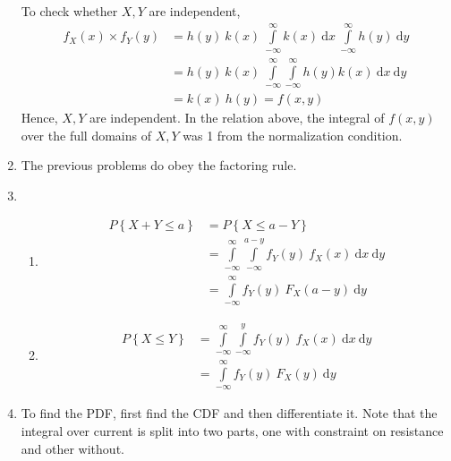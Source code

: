 \begin{enumerate}
		To check whether $ X, Y $ are independent,
		\begin{align}
			f_X (x) \times f_Y (y) &= h(y) \ k(x) \ \int\limits_{-\infty}^{\infty} k(x)\ \mathrm{d}x \ \int\limits_{-\infty}^{\infty} h(y)\ \mathrm{d}y \nonumber \\
			&= h(y) \ k(x)\ \int\limits_{-\infty}^{\infty} \int\limits_{-\infty}^{\infty} h(y) k(x) \ \mathrm{d}x \ \mathrm{d}y  \nonumber \\
			&= k(x)\ h(y) = f(x, y)
		\end{align}
		Hence, $ X, Y $ are independent. In the relation above, the integral of $ f(x, y) $ over the full domains of $ X, Y $ was 1 from the normalization condition.
	
	
	\item The previous problems do obey the factoring rule.
	
	\item 
		\begin{enumerate}
			\item \begin{align}
				P \left\{X + Y \leq a \right\} &= P \left\{ X \leq a - Y \right\} \nonumber \\
				&= \int\limits_{-\infty}^{\infty} \int\limits_{-\infty}^{a - y} f_Y (y) \ f_X(x) \ \mathrm{d}x \ \mathrm{d}y  \nonumber \\
				&= \int\limits_{-\infty}^{\infty} f_Y (y) \ F_X(a - y) \ \mathrm{d}y 
			\end{align}
			
			\item \begin{align}
				P \left\{ X \leq Y \right\} &= \int\limits_{-\infty}^{\infty} \int\limits_{-\infty}^{y} f_Y (y) \ f_X(x) \ \mathrm{d}x \ \mathrm{d}y  \nonumber \\
				&= \int\limits_{-\infty}^{\infty} f_Y (y) \ F_X(y) \ \mathrm{d}y 
			\end{align}
		\end{enumerate}
	
	
	\item To find the PDF, first find the CDF and then differentiate it. Note that the integral over current is split into two parts, one with constraint on resistance and other without.
	

\end{enumerate}
